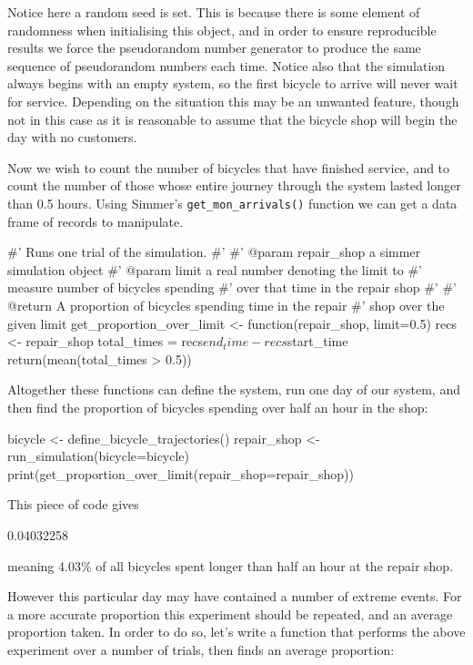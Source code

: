 Notice here a random seed is set. This is because there is some element of
randomness when initialising this object, and in order to ensure reproducible
results we force the pseudorandom number generator to produce the same sequence
of pseudorandom numbers each time.
Notice also that the simulation always begins with an empty system, so the first
bicycle to arrive will never wait for service. Depending on the situation this
may be an unwanted feature, though not in this case as it is reasonable to
assume that the bicycle shop will begin the day with no customers.

Now we wish to count the number of bicycles that have finished service, and to
count the number of those whose entire journey through the system lasted longer
than 0.5 hours. Using Simmer's \texttt{get_mon_arrivals()} function we
can get a data frame of records to manipulate.

\begin{Rin}
#' Runs one trial of the simulation.
#'
#' @param repair_shop a simmer simulation object
#' @param limit a real number denoting the limit to
#'              measure number of bicycles spending
#'              over that time in the repair shop
#'
#' @return A proportion of bicycles spending time in the repair
#'         shop over the given limit
get_proportion_over_limit <- function(repair_shop, limit=0.5){
  recs <- repair_shop %
  total_times = recs$end_time - recs$start_time
  return(mean(total_times > 0.5))
}
\end{Rin}

Altogether these functions can define the system, run one day of our system, and
then find the proportion of bicycles spending over half an hour in the shop:

\begin{Rin}
bicycle <- define_bicycle_trajectories()
repair_shop <- run_simulation(bicycle=bicycle)
print(get_proportion_over_limit(repair_shop=repair_shop))
\end{Rin}

This piece of code gives

\begin{Rout}
[1] 0.04032258
\end{Rout}

meaning 4.03\% of all bicycles spent longer than half an hour at the repair
shop.

However this particular day may have contained a number of extreme events.
For a more accurate proportion this experiment should be repeated, and an
average proportion taken.
In order to do so, let's write a function that performs the above experiment
over a number of trials, then finds an average proportion:

